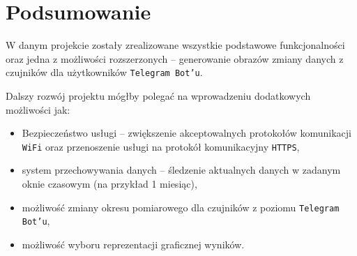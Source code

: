 \section{Podsumowanie}
W danym projekcie zostały zrealizowane wszystkie podstawowe 
funkcjonalności oraz jedna z możliwości rozszerzonych -- generowanie obrazów
zmiany danych z czujników dla użytkowników \texttt{Telegram Bot'u}.

Dalszy rozwój projektu mógłby polegać na wprowadzeniu dodatkowych
możliwości jak:
\begin{itemize}
  \item Bezpieczeństwo usługi -- zwiększenie akceptowalnych protokołów komunikacji \texttt{WiFi}
    oraz przenoszenie usługi na protokół komunikacyjny \texttt{HTTPS},
  \item system przechowywania danych -- śledzenie aktualnych danych w zadanym oknie czasowym
    (na przykład 1 miesiąc),
  \item możliwość zmiany okresu pomiarowego dla czujników z poziomu \texttt{Telegram Bot'u},
  \item możliwość wyboru reprezentacji graficznej wyników.
\end{itemize}

